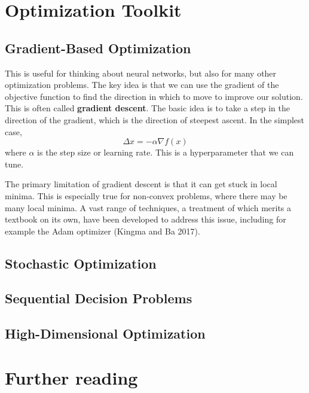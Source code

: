 \documentclass[
  letterpaper,
  DIV=11,
  numbers=noendperiod]{scrreprt}
\begin{document}
\section{Optimization Toolkit}\label{optimization-toolkit}

\subsection{Gradient-Based
Optimization}\label{gradient-based-optimization}

This is useful for thinking about neural networks, but also for many
other optimization problems. The key idea is that we can use the
gradient of the objective function to find the direction in which to
move to improve our solution. This is often called \textbf{gradient
descent}. The basic idea is to take a step in the direction of the
gradient, which is the direction of steepest ascent. In the simplest
case, \[
\Delta x = -\alpha \nabla f(x)
\] where \(\alpha\) is the step size or learning rate. This is a
hyperparameter that we can tune.

The primary limitation of gradient descent is that it can get stuck in
local minima. This is especially true for non-convex problems, where
there may be many local minima. A vast range of techniques, a treatment
of which merits a textbook on its own, have been developed to address
this issue, including for example the Adam optimizer (Kingma and Ba
2017).

\subsection{Stochastic Optimization}\label{stochastic-optimization}

\subsection{Sequential Decision
Problems}\label{sequential-decision-problems}

\subsection{High-Dimensional
Optimization}\label{high-dimensional-optimization}

\section*{Further reading}\label{further-reading-3}
\end{document}
